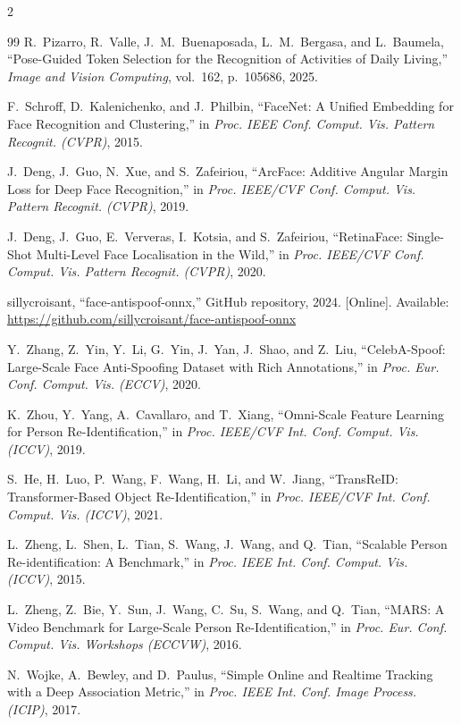 \documentclass[a4paper, twoside, 12pt]{article}
\begin{document}
\begin{multicols}{2}
\begin{thebibliography}{99}
R.~Pizarro, R.~Valle, J.~M.~Buenaposada, L.~M.~Bergasa, and L.~Baumela,
``Pose-Guided Token Selection for the Recognition of Activities of Daily Living,''
\textit{Image and Vision Computing}, vol.~162, p.~105686, 2025.

F.~Schroff, D.~Kalenichenko, and J.~Philbin,
``FaceNet: A Unified Embedding for Face Recognition and Clustering,''
in \textit{Proc. IEEE Conf. Comput. Vis. Pattern Recognit. (CVPR)}, 2015.

J.~Deng, J.~Guo, N.~Xue, and S.~Zafeiriou,
``ArcFace: Additive Angular Margin Loss for Deep Face Recognition,''
in \textit{Proc. IEEE/CVF Conf. Comput. Vis. Pattern Recognit. (CVPR)}, 2019.

J.~Deng, J.~Guo, E.~Ververas, I.~Kotsia, and S.~Zafeiriou,
``RetinaFace: Single-Shot Multi-Level Face Localisation in the Wild,''
in \textit{Proc. IEEE/CVF Conf. Comput. Vis. Pattern Recognit. (CVPR)}, 2020.

sillycroisant,
``face-antispoof-onnx,''
GitHub repository, 2024.
[Online]. Available: \url{https://github.com/sillycroisant/face-antispoof-onnx}

Y.~Zhang, Z.~Yin, Y.~Li, G.~Yin, J.~Yan, J.~Shao, and Z.~Liu,
``CelebA-Spoof: Large-Scale Face Anti-Spoofing Dataset with Rich Annotations,''
in \textit{Proc. Eur. Conf. Comput. Vis. (ECCV)}, 2020.

K.~Zhou, Y.~Yang, A.~Cavallaro, and T.~Xiang,
``Omni-Scale Feature Learning for Person Re-Identification,''
in \textit{Proc. IEEE/CVF Int. Conf. Comput. Vis. (ICCV)}, 2019.

S.~He, H.~Luo, P.~Wang, F.~Wang, H.~Li, and W.~Jiang,
``TransReID: Transformer-Based Object Re-Identification,''
in \textit{Proc. IEEE/CVF Int. Conf. Comput. Vis. (ICCV)}, 2021.

L.~Zheng, L.~Shen, L.~Tian, S.~Wang, J.~Wang, and Q.~Tian,
``Scalable Person Re-identification: A Benchmark,''
in \textit{Proc. IEEE Int. Conf. Comput. Vis. (ICCV)}, 2015.

L.~Zheng, Z.~Bie, Y.~Sun, J.~Wang, C.~Su, S.~Wang, and Q.~Tian,
``MARS: A Video Benchmark for Large-Scale Person Re-Identification,''
in \textit{Proc. Eur. Conf. Comput. Vis. Workshops (ECCVW)}, 2016.

N.~Wojke, A.~Bewley, and D.~Paulus,
``Simple Online and Realtime Tracking with a Deep Association Metric,''
in \textit{Proc. IEEE Int. Conf. Image Process. (ICIP)}, 2017.


\end{thebibliography}
\end{multicols}
\end{document}
